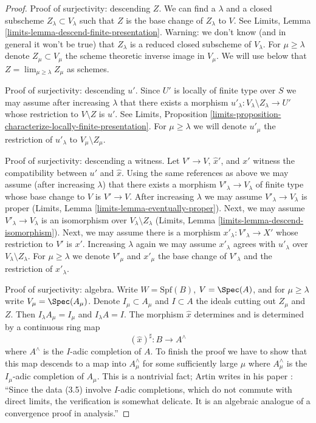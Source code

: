 \begin{proof}
\medskip\noindent
Proof of surjectivity: descending $Z$. We can find a $\lambda$
and a closed subscheme $Z_\lambda \subset V_\lambda$ such that
$Z$ is the base change of $Z_\lambda$ to $V$. See
Limits, Lemma \ref{limits-lemma-descend-finite-presentation}.
Warning: we don't know (and in general it won't be true)
that $Z_\lambda$ is a reduced closed subscheme of $V_\lambda$.
For $\mu \geq \lambda$ denote $Z_\mu \subset V_\mu$ the scheme theoretic
inverse image in $V_\mu$. We will use below that
$Z = \lim_{\mu \geq \lambda} Z_\mu$ as schemes.

\medskip\noindent
Proof of surjectivity: descending $u'$.
Since $U'$ is locally of finite type over $S$
we may assume after increasing $\lambda$
that there exists a morphism
$u'_\lambda : V_\lambda \setminus Z_\lambda \to U'$
whose restriction to $V \setminus Z$ is $u'$.
See Limits, Proposition
\ref{limits-proposition-characterize-locally-finite-presentation}.
For $\mu \geq \lambda$ we will denote $u'_\mu$ the restriction
of $u'_\lambda$ to $V_\mu \setminus Z_\mu$.

\medskip\noindent
Proof of surjectivity: descending a witness.
Let $V' \to V$, $\hat x'$, and $x'$ witness the compatibility between
$u'$ and $\hat x$. Using the same references as above we may assume
(after increasing $\lambda$) that there exists a morphism
$V'_\lambda \to V_\lambda$ of finite type whose base change to $V$
is $V' \to V$. After increasing $\lambda$ we may assume
$V'_\lambda \to V_\lambda$ is proper
(Limits, Lemma \ref{limits-lemma-eventually-proper}).
Next, we may assume $V'_\lambda \to V_\lambda$ is an isomorphism
over $V_\lambda \setminus Z_\lambda$
(Limits, Lemma \ref{limits-lemma-descend-isomorphism}).
Next, we may assume there is a morphism $x'_\lambda : V'_\lambda \to X'$
whose restriction to $V'$ is $x'$.
Increasing $\lambda$ again we may assume $x'_\lambda$
agrees with $u'_\lambda$ over $V_\lambda \setminus Z_\lambda$.
For $\mu \geq \lambda$ we denote
$V'_\mu$ and $x'_\mu$ the base change of $V'_\lambda$ and the
restriction of $x'_\lambda$.

\medskip\noindent
Proof of surjectivity: algebra.
Write $W = \text{Spf}(B)$, $V = \Spec(A)$, and
for $\mu \geq \lambda$ write $V_\mu = \Spec(A_\mu)$.
Denote $I_\mu \subset A_\mu$ and $I \subset A$
the ideals cutting out $Z_\mu$ and $Z$.
Then $I_\lambda A_\mu = I_\mu$ and $I_\lambda A = I$.
The morphism $\hat x$ determines and is determined by a
continuous ring map
$$
(\hat x)^\sharp : B \longrightarrow A^\wedge
$$
where $A^\wedge$ is the $I$-adic completion of $A$.
To finish the proof we have to show that this map descends to a map into
$A_\mu^\wedge$ for some sufficiently large $\mu$ where $A_\mu^\wedge$
is the $I_\mu$-adic completion of $A_\mu$.
This is a nontrivial fact; Artin writes in his paper
\cite{ArtinII}: ``Since the data (3.5) involve $I$-adic completions,
which do not commute with direct limits, the verification is somewhat
delicate. It is an algebraic analogue of a convergence proof in analysis.''


\end{proof}
